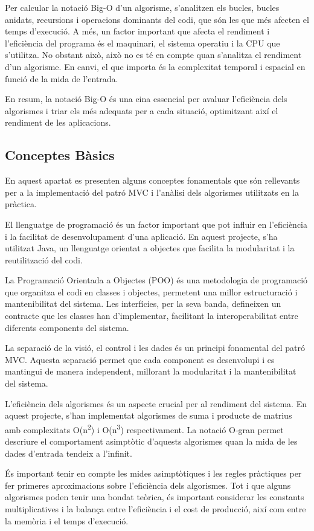 \documentclass{ieeetj}
\begin{document}
Per calcular la notació Big-O d'un algorisme, s'analitzen els bucles, bucles anidats, recursions i operacions dominants del codi, que són les que més afecten el temps d'execució. A més, un factor important que afecta el rendiment i l'eficiència del programa és el maquinari, el sistema operatiu i la CPU que s'utilitza. No obstant això, això no es té en compte quan s'analitza el rendiment d'un algorisme. En canvi, el que importa és la complexitat temporal i espacial en funció de la mida de l'entrada.

En resum, la notació Big-O és una eina essencial per avaluar l'eficiència dels algorismes i triar els més adequats per a cada situació, optimitzant així el rendiment de les aplicacions.

\subsection{Conceptes Bàsics}
En aquest apartat es presenten alguns conceptes fonamentals que són rellevants per a la implementació del patró MVC i l'anàlisi dels algorismes utilitzats en la pràctica.

El llenguatge de programació és un factor important que pot influir en l'eficiència i la facilitat de desenvolupament d'una aplicació. En aquest projecte, s'ha utilitzat Java, un llenguatge orientat a objectes que facilita la modularitat i la reutilització del codi.

La Programació Orientada a Objectes (POO) és una metodologia de programació que organitza el codi en classes i objectes, permetent una millor estructuració i mantenibilitat del sistema. Les interfícies, per la seva banda, defineixen un contracte que les classes han d'implementar, facilitant la interoperabilitat entre diferents components del sistema.

La separació de la visió, el control i les dades és un principi fonamental del patró MVC. Aquesta separació permet que cada component es desenvolupi i es mantingui de manera independent, millorant la modularitat i la mantenibilitat del sistema.

L'eficiència dels algorismes és un aspecte crucial per al rendiment del sistema. En aquest projecte, s'han implementat algorismes de suma i producte de matrius amb complexitats O(n\textsuperscript{2}) i O(n\textsuperscript{3}) respectivament. La notació O-gran permet descriure el comportament asimptòtic d'aquests algorismes quan la mida de les dades d'entrada tendeix a l'infinit.

És important tenir en compte les mides asimptòtiques i les regles pràctiques per fer primeres aproximacions sobre l'eficiència dels algorismes. Tot i que alguns algorismes poden tenir una bondat teòrica, és important considerar les constants multiplicatives i la balança entre l'eficiència i el cost de producció, així com entre la memòria i el temps d'execució.
\end{document}
